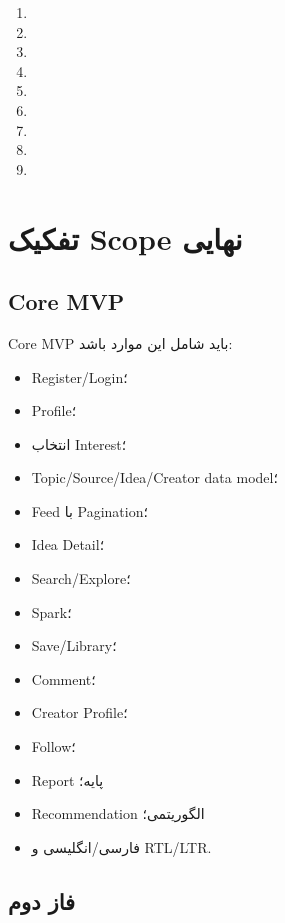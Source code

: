 \begin{enumerate}
  \item {}
  \item {}
  \item {}
  \item {}
  \item {}
  \item {}
  \item {}
  \item {}
  \item {}
\end{enumerate}

\section{تفکیک Scope نهایی}

\subsection{Core MVP}

Core MVP باید شامل این موارد باشد:
\begin{itemize}
  \item Register/Login؛
  \item Profile؛
  \item انتخاب Interest؛
  \item Topic/Source/Idea/Creator data model؛
  \item Feed با Pagination؛
  \item Idea Detail؛
  \item Search/Explore؛
  \item Spark؛
  \item Save/Library؛
  \item Comment؛
  \item Creator Profile؛
  \item Follow؛
  \item Report پایه؛
  \item Recommendation الگوریتمی؛
  \item فارسی/انگلیسی و RTL/LTR.
\end{itemize}

\subsection{فاز دوم}

